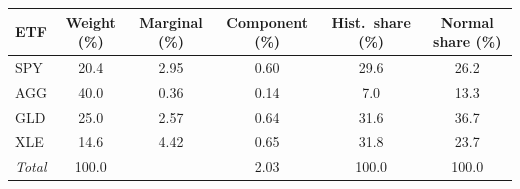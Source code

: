 \begin{tabular}{@{}lS[table-format=3.1]S[table-format=1.2]S[table-format=1.2]S[table-format=3.1]S[table-format=3.1]@{}}
\toprule
ETF & {Weight (\%)} & {Marginal (\%)} & {Component (\%)} & {Hist.\ share (\%)} & {Normal share (\%)} \\
\midrule
SPY & 20.4 & 2.95 & 0.60 & 29.6 & 26.2 \\
AGG & 40.0 & 0.36 & 0.14 & 7.0 & 13.3 \\
GLD & 25.0 & 2.57 & 0.64 & 31.6 & 36.7 \\
XLE & 14.6 & 4.42 & 0.65 & 31.8 & 23.7 \\
\midrule
\textit{Total} & 100.0 &  & 2.03 & 100.0 & 100.0 \\
\bottomrule
\end{tabular}
